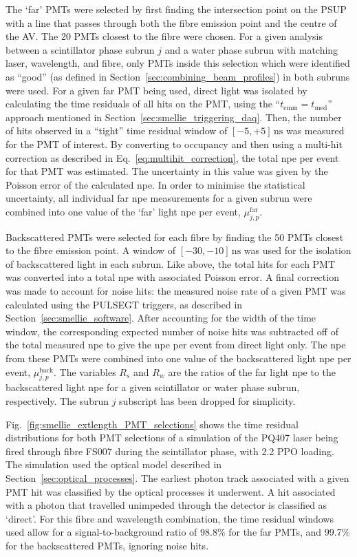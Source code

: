 The `far' PMTs were selected by first finding the intersection point on the PSUP with a line that passes through both the fibre emission point and the centre of the AV. The 20 PMTs closest to the fibre were chosen. For a given analysis between a scintillator phase subrun $j$ and a water phase subrun with matching laser, wavelength, and fibre, only PMTs inside this selection which were identified as ``good'' (as defined in Section~\ref{sec:combining_beam_profiles}) in both subruns were used. For a given far PMT being used, direct light was isolated by calculating the time residuals of all hits on the PMT, using the ``$t_{\mathrm{emm}} = t_{\mathrm{med}}$'' approach mentioned in Section~\ref{sec:smellie_triggering_daq}. Then, the number of hits observed in a ``tight'' time residual window of $[-5,+5]\,\si{\ns}$ was measured for the PMT of interest. By converting to occupancy and then using a multi-hit correction as described in Eq.~\ref{eq:multihit_correction}, the total npe per event for that PMT was estimated. The uncertainty in this value was given by the Poisson error of the calculated npe. In order to minimise the statistical uncertainty, all individual far npe measurements for a given subrun were combined into one value of the `far' light npe per event, $\mu_{j,p}^{\mathrm{far}}$.

Backscattered PMTs were selected for each fibre by finding the 50 PMTs closest to the fibre emission point. A \tres{} window of $[-30,-10]\,\si{\ns}$ was used for the isolation of backscattered light in each subrun. Like above, the total hits for each PMT was converted into a total npe with associated Poisson error. A final correction was made to account for noise hits: the measured noise rate of a given PMT was calculated using the PULSEGT triggers, as described in Section~\ref{sec:smellie_software}. After accounting for the width of the time window, the corresponding expected number of noise hits was subtracted off of the total measured npe to give the npe per event from direct light only. The npe from these PMTs were combined into one value of the backscattered light npe per event, $\mu_{j,p}^{\mathrm{back}}$. The variables $R_{s}$ and $R_{w}$ are the ratios of the far light npe to the backscattered light npe for a given scintillator or water phase subrun, respectively. The subrun $j$ subscript has been dropped for simplicity.

Fig.~\ref{fig:smellie_extlength_PMT_selections} shows the time residual distributions for both PMT selections of a simulation of the PQ407 laser being fired through fibre FS007 during the scintillator phase, with \SI{2.2}{\gpl} PPO loading. The simulation used the optical model described in Section~\ref{sec:optical_processes}. The earliest photon track associated with a given PMT hit was classified by the optical processes it underwent. A hit associated with a photon that travelled unimpeded through the detector is classified as `direct'. For this fibre and wavelength combination, the time residual windows used allow for a signal-to-background ratio of 98.8\% for the far PMTs, and 99.7\% for the backscattered PMTs, ignoring noise hits.


